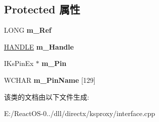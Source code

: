 \subsection*{Protected 属性}
\begin{DoxyCompactItemize}
\item 
\mbox{\label{class_c_ks_interface_handler_a0892ce87029370c543c66d93c300705a}} 
L\+O\+NG {\bfseries m\+\_\+\+Ref}
\item 
\mbox{\label{class_c_ks_interface_handler_a3111e91f2cc5fbc7a9d2db53089374e5}} 
\hyperlink{interfacevoid}{H\+A\+N\+D\+LE} {\bfseries m\+\_\+\+Handle}
\item 
\mbox{\label{class_c_ks_interface_handler_a04bba43e653cea1a3f8babe5386af1ed}} 
I\+Ks\+Pin\+Ex $\ast$ {\bfseries m\+\_\+\+Pin}
\item 
\mbox{\label{class_c_ks_interface_handler_a74da67f6ec751c3973bf8b94fa8ce7b7}} 
W\+C\+H\+AR {\bfseries m\+\_\+\+Pin\+Name} \mbox{[}129\mbox{]}
\end{DoxyCompactItemize}


该类的文档由以下文件生成\+:\begin{DoxyCompactItemize}
\item 
E\+:/\+React\+O\+S-\/0../dll/directx/ksproxy/interface.\+cpp\end{DoxyCompactItemize}
